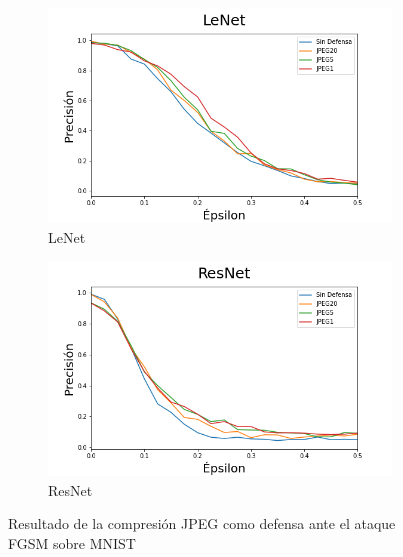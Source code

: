 \begin{figure}[h]
    \centering
    \begin{subfigure}[b]{0.49\textwidth}
        \centering
        \includegraphics[width=\textwidth]{images/jpeg/jpegdefense_vs_epsilon_linear.png}
        \caption{LeNet}
    \end{subfigure}
    \begin{subfigure}[b]{0.49\textwidth}
        \centering
        \includegraphics[width=\textwidth]{images/jpeg/jpegdefense_vs_epsilon_nonlinear.png}
        \caption{ResNet}
    \end{subfigure}
    \caption{Resultado de la compresión JPEG como defensa ante el ataque FGSM sobre MNIST}
    \label{jpeg_def}
\end{figure}

